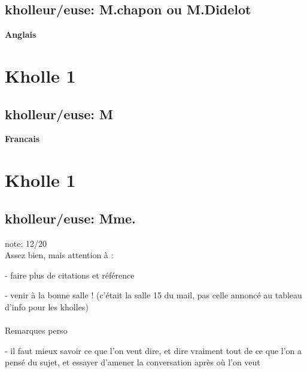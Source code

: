 \documentclass{article}
\begin{document}
\subsection{kholleur/euse: M.chapon ou M.Didelot}

\vspace{5mm}


\begin{center}
\textbf{\large Anglais}
\end{center} \vspace{0.2cm}

\section{Kholle 1}
\subsection{kholleur/euse: M}


\begin{center}
\textbf{\large Francais}
\end{center} \vspace{0.2cm}

\section{Kholle 1}
\subsection{kholleur/euse: Mme.}

note: 12/20 \\

Assez bien, mais attention à :

- faire plus de citations et référence

- venir à la bonne salle ! (c'était la salle 15 du mail, pas celle annoncé au tableau d'info pour les kholles) \\ \\
Remarques perso

- il faut mieux savoir ce que l'on veut dire, et dire vraiment tout de ce que l'on a pensé du sujet, et essayer d'amener la conversation après où l'on veut
\end{document}
